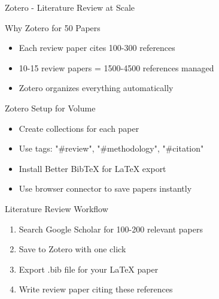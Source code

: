 \documentclass[11pt]{beamer}
\begin{document}
	\begin{frame}{Zotero - Literature Review at Scale}
		\scriptsize
		\begin{block}{Why Zotero for 50 Papers}
			\begin{itemize}
				\item Each review paper cites 100-300 references
				\item 10-15 review papers = 1500-4500 references managed
				\item Zotero organizes everything automatically
			\end{itemize}
		\end{block}
		\begin{block}{Zotero Setup for Volume}
			\begin{itemize}
				\item Create collections for each paper
				\item Use tags: "\#review", "\#methodology", "\#citation"
				\item Install Better BibTeX for LaTeX export
				\item Use browser connector to save papers instantly
			\end{itemize}
		\end{block}
		\begin{block}{Literature Review Workflow}
			\begin{enumerate}
				\item Search Google Scholar for 100-200 relevant papers
				\item Save to Zotero with one click
				\item Export .bib file for your LaTeX paper
				\item Write review paper citing these references
			\end{enumerate}
		\end{block}
	\end{frame}
	
\end{document}
